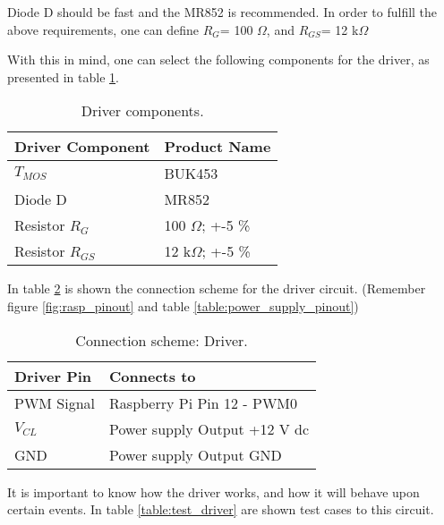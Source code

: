 Diode D should be fast and the MR852 is recommended.
In order to fulfill the above requirements, one can define \(R_{G}\)= 100 $\Omega$, and \(R_{GS}\)= 12 k$\Omega$  \linebreak

With this in mind, one can select the following components for the driver, as presented in table \ref{table:driver_components}.

\begin{table}[H]
	\centering
		\begin{tabular}{|m{5cm}|m{6cm}|}
			\hline
			\textbf{Driver Component} & \textbf{Product Name}
			\\\hline\hline
			
			\(T_{MOS}\) & BUK453
			\\\hline
			Diode D & MR852
			\\\hline
			Resistor \(R_{G}\) & 100 $\Omega$; +-5 \%
			\\\hline
			Resistor \(R_{GS}\) & 12 k$\Omega$; +-5 \%
			\\\hline
		\end{tabular}
	\caption{Driver components.}
	\label{table:driver_components}
\end{table}


In table \ref{table:connect_driver} is shown the connection scheme for the driver circuit. (Remember figure \ref{fig:rasp_pinout} and table \ref{table:power_supply_pinout})

\begin{table}[H]
	\centering
	\begin{tabular}{|m{5cm}|m{6cm}|}
		\hline
		\textbf{Driver Pin} & \textbf{Connects to}
		\\\hline\hline
		
		PWM Signal & Raspberry Pi Pin 12 - PWM0
		\\\hline
		\(V_{CL}\) & Power supply Output +12 V \ac{dc}
		\\\hline
		GND & Power supply Output GND
		\\\hline
	\end{tabular}
	
	\caption{Connection scheme: Driver.}
	\label{table:connect_driver}
\end{table}


It is important to know how the driver works, and how it will behave upon certain events. In table \ref{table:test_driver} are shown test cases to this circuit.


